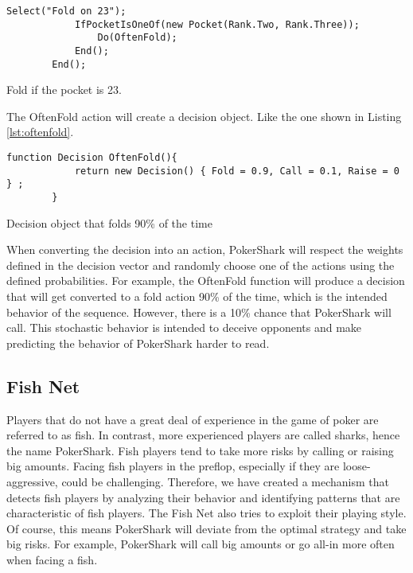 \begin{Listing}
    \begin{lstlisting}[language={[Sharp]C}]
        Select("Fold on 23");
	        IfPocketIsOneOf(new Pocket(Rank.Two, Rank.Three));
		        Do(OftenFold);
	        End();
        End();
    \end{lstlisting}
    \caption{Fold if the pocket is 23.}
    \label{lst:vector}
\end{Listing}

The OftenFold action will create a decision object. Like the one shown in Listing \ref{lst:oftenfold}.

\begin{Listing}
    \begin{lstlisting}[language={[Sharp]C}]
        function Decision OftenFold(){
            return new Decision() { Fold = 0.9, Call = 0.1, Raise = 0 } ;
        }
    \end{lstlisting}
    \caption{Decision object that folds 90\% of the time}
    \label{lst:oftenfold}
\end{Listing}

When converting the decision into an action, PokerShark will respect the weights defined in the decision vector and randomly choose one of the actions using the defined probabilities. For example, the OftenFold function will produce a decision that will get converted to a fold action 90\% of the time, which is the intended behavior of the sequence. However, there is a 10\% chance that PokerShark will call. This stochastic behavior is intended to deceive opponents and make predicting the behavior of PokerShark harder to read. 



\subsection{Fish Net}
Players that do not have a great deal of experience in the game of poker are referred to as fish. In contrast, more experienced players are called sharks, hence the name PokerShark.
Fish players tend to take more risks by calling or raising big amounts. Facing fish players in the preflop, especially if they are loose-aggressive, could be challenging. Therefore, we have created a mechanism that detects fish players by analyzing their behavior and identifying patterns that are characteristic of fish players. The Fish Net also tries to exploit their playing style. Of course, this means PokerShark will deviate from the optimal strategy and take big risks. For example, PokerShark will call big amounts or go all-in more often when facing a fish.



